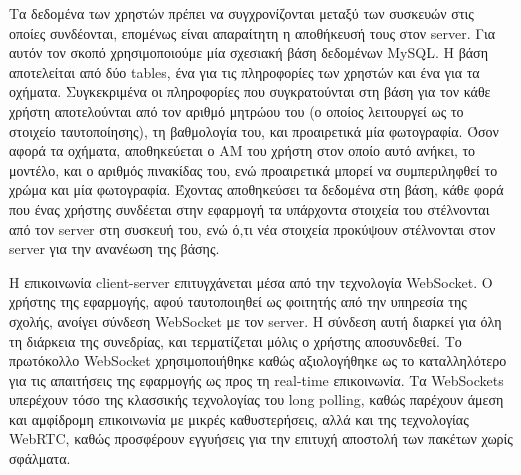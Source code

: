 \documentclass[../thesis.tex]{subfiles}
\begin{document}
Τα δεδομένα των χρηστών πρέπει να συγχρονίζονται μεταξύ των συσκευών στις οποίες συνδέονται, επομένως είναι απαραίτητη η αποθήκευσή τους στον server.
Για αυτόν τον σκοπό χρησιμοποιούμε μία σχεσιακή βάση δεδομένων MySQL.
Η βάση αποτελείται από δύο tables, ένα για τις πληροφορίες των χρηστών και ένα για τα οχήματα.
Συγκεκριμένα οι πληροφορίες που συγκρατούνται στη βάση για τον κάθε χρήστη αποτελούνται από τον αριθμό μητρώου του (ο οποίος λειτουργεί ως το στοιχείο ταυτοποίησης), τη βαθμολογία του, και προαιρετικά μία φωτογραφία.
Όσον αφορά τα οχήματα, αποθηκεύεται ο ΑΜ του χρήστη στον οποίο αυτό ανήκει, το μοντέλο, και ο αριθμός πινακίδας του, ενώ προαιρετικά μπορεί να συμπεριληφθεί το χρώμα και μία φωτογραφία.
Έχοντας αποθηκεύσει τα δεδομένα στη βάση, κάθε φορά που ένας χρήστης συνδέεται στην εφαρμογή τα υπάρχοντα στοιχεία του στέλνονται από τον server στη συσκευή του, ενώ ό,τι νέα στοιχεία προκύψουν στέλνονται στον server για την ανανέωση της βάσης.

Η επικοινωνία client-server επιτυγχάνεται μέσα από την τεχνολογία WebSocket.
Ο χρήστης της εφαρμογής, αφού ταυτοποιηθεί ως φοιτητής από την υπηρεσία της σχολής, ανοίγει σύνδεση WebSocket με τον server.
Η σύνδεση αυτή διαρκεί για όλη τη διάρκεια της συνεδρίας, και τερματίζεται μόλις ο χρήστης αποσυνδεθεί.
Το πρωτόκολλο WebSocket χρησιμοποιήθηκε καθώς αξιολογήθηκε ως το καταλληλότερο για τις απαιτήσεις της εφαρμογής ως προς τη real-time επικοινωνία.
Τα WebSockets υπερέχουν τόσο της κλασσικής τεχνολογίας του long polling, καθώς παρέχουν άμεση και αμφίδρομη επικοινωνία με μικρές καθυστερήσεις, αλλά και της τεχνολογίας WebRTC, καθώς προσφέρουν εγγυήσεις για την επιτυχή αποστολή των πακέτων χωρίς σφάλματα.
\end{document}

